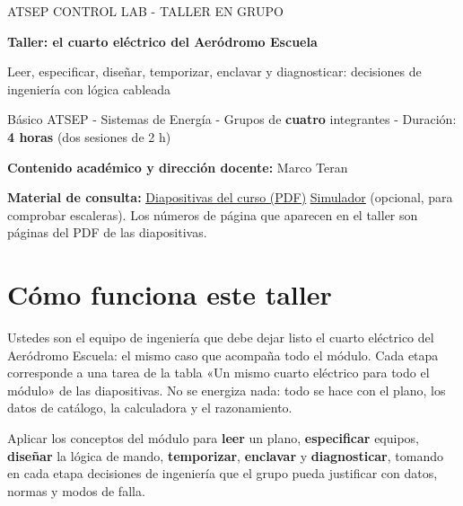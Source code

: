 \documentclass[11pt,a4paper]{article}
\newif\ifdocente
\begin{document}
\thispagestyle{empty}

{\color{azul}\ttfamily\small ATSEP CONTROL LAB - TALLER EN GRUPO\ifdocente\ \textcolor{rojo}{- VERSIÓN DOCENTE CON SOLUCIONES}\fi}\par\vspace{4pt}
{\LARGE\bfseries\color{navy} Taller: el cuarto eléctrico del Aeródromo Escuela\par}\vspace{4pt}
{\large\color{pizarra} Leer, especificar, diseñar, temporizar, enclavar y diagnosticar: decisiones de ingeniería con lógica cableada\par}\vspace{6pt}
{\small Básico ATSEP - Sistemas de Energía - Grupos de \textbf{cuatro} integrantes - Duración: \textbf{4 horas} (dos sesiones de 2 h)\par
\textbf{Contenido académico y dirección docente:} Marco Teran}

\vspace{6pt}
\noindent\textbf{Material de consulta:}
\href{https://github.com/marcoteran/atsep-energy-control-labs/raw/refs/heads/master/presentaciones/marcoteran_energy_electriccontroland_wiredlogyc.pdf}{\textcolor{azul}{\underline{Diapositivas del curso (PDF)}}}
\quad
\href{https://atsep-controllogyc.vercel.app/}{\textcolor{azul}{\underline{Simulador}}} (opcional, para comprobar escaleras).
Los números de página que aparecen en el taller son páginas del PDF de las diapositivas.

\section*{Cómo funciona este taller}

Ustedes son el equipo de ingeniería que debe dejar listo el cuarto eléctrico del Aeródromo Escuela: el mismo caso que acompaña todo el módulo. Cada etapa corresponde a una tarea de la tabla «Un mismo cuarto eléctrico para todo el módulo» de las diapositivas. No se energiza nada: todo se hace con el plano, los datos de catálogo, la calculadora y el razonamiento.

\begin{objetivo}
Aplicar los conceptos del módulo para \textbf{leer} un plano, \textbf{especificar} equipos, \textbf{diseñar} la lógica de mando, \textbf{temporizar}, \textbf{enclavar} y \textbf{diagnosticar}, tomando en cada etapa decisiones de ingeniería que el grupo pueda justificar con datos, normas y modos de falla.
\end{objetivo}
\end{document}
